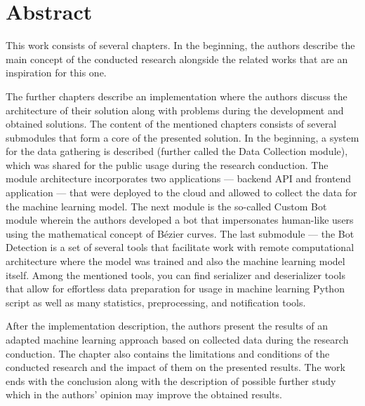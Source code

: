 \section{Abstract}\label{sec:abstract}
This work consists of several chapters.
In the beginning, the authors describe the main concept of the conducted research alongside the related works that are an inspiration for this one.

The further chapters describe an implementation where the authors discuss the architecture of their solution along with problems during the development and obtained solutions.
The content of the mentioned chapters consists of several submodules that form a core of the presented solution.
In the beginning, a system for the data gathering is described (further called the Data Collection module), which was shared for the public usage during the research conduction.
The module architecture incorporates two applications --- backend API and frontend application --- that were deployed to the cloud and allowed to collect the data for the machine learning model.
The next module is the so-called Custom Bot module wherein the authors developed a bot that impersonates human-like users using the mathematical concept of Bézier curves.
The last submodule --- the Bot Detection is a set of several tools that facilitate work with remote computational architecture where the model was trained and also the machine learning model itself.
Among the mentioned tools, you can find serializer and deserializer tools that allow for effortless data preparation for usage in machine learning Python script as well as many statistics, preprocessing, and notification tools.

After the implementation description, the authors present the results of an adapted machine learning approach based on collected data during the research conduction.
The chapter also contains the limitations and conditions of the conducted research and the impact of them on the presented results.
The work ends with the conclusion along with the description of possible further study which in the authors' opinion may improve the obtained results.